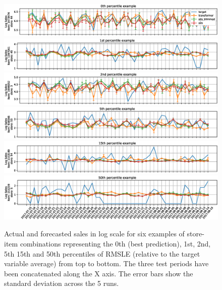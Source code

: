 \begin{figure}
	\centering
	\includegraphics[width=1\linewidth]{salesforecast/images/sample_0_log}
	\includegraphics[width=1\linewidth]{salesforecast/images/sample_1_log}
	\includegraphics[width=1\linewidth]{salesforecast/images/sample_2_log}
	\includegraphics[width=1\linewidth]{salesforecast/images/sample_3_log}
	\includegraphics[width=1\linewidth]{salesforecast/images/sample_4_log}
	\includegraphics[width=1\linewidth]{salesforecast/images/sample_5_log}
\caption[Actual and forecasted sales timeseries examples in log scale]{Actual and forecasted sales in log scale for six examples of store-item combinations representing the 0th (best prediction), 1st, 2nd, 5th 15th and 50th percentiles of RMSLE (relative to the target variable average) from top to bottom. The three test periods have been concatenated along the X axis. The error bars show the standard deviation across the 5 runs. }
	\label{fig:ts_log}
\end{figure}

